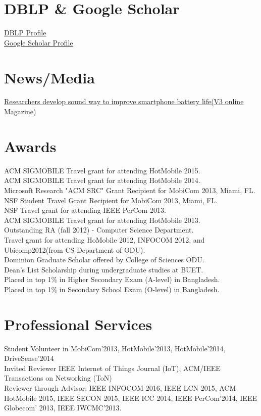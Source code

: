 \documentclass[margin]{res}
\begin{document}
\begin{resume}
\section{DBLP \& Google Scholar}
\href{http://dblp.uni-trier.de/pers/hd/u/Uddin:Mostafa}{DBLP Profile} \\
\href{https://scholar.google.com/citations?user=6uSlsIIAAAAJ&hl=en}{Google Scholar Profile}\\


\section{News/Media}
\href{http://www.v3.co.uk/v3-uk/the-frontline-blog/2240952/researchers-develop-sound-way-to-improve-smartphone-battery-life}{Researchers develop sound way to improve smartphone battery life(V3 online Magazine)}

\section{Awards}
ACM SIGMOBILE Travel grant for attending HotMobile 2015. \\
ACM SIGMOBILE Travel grant for attending HotMobile 2014. \\
Microsoft Research "ACM SRC" Grant Recipient for MobiCom 2013, Miami, FL. \\
NSF Student Travel Grant Recipient for MobiCom 2013, Miami, FL. \\
NSF Travel grant for attending IEEE PerCom 2013. \\
ACM SIGMOBILE Travel grant for attending HotMobile 2013. \\
Outstanding RA (fall 2012) - Computer Science Department. \\
Travel grant for attending HoMobile 2012, INFOCOM 2012, and Ubicomp2012(from CS Department of  ODU).\\
Dominion Graduate Scholar offered by College of Sciences ODU.\\ 
Dean's List Scholarship during undergraduate studies at BUET. \\
Placed in top 1\% in Higher Secondary Exam (A-level) in Bangladesh. \\
Placed in top 1\% in Secondary School Exam (O-level) in Bangladesh. \\ 


\section{Professional Services}
Student Volunteer in MobiCom'2013, HotMobile'2013, HotMobile'2014, DriveSense'2014 \\
Invited Reviewer IEEE Internet of Things Journal (IoT), ACM/IEEE Transactions on Networking (ToN) \\
Reviewer through Advisor: IEEE INFOCOM 2016, IEEE LCN 2015, ACM HotMobile 2015, IEEE SECON 2015, IEEE ICC 2014, IEEE PerCom'2014, IEEE Globecom' 2013, IEEE IWCMC'2013.\\


\end{resume}
\end{document}
